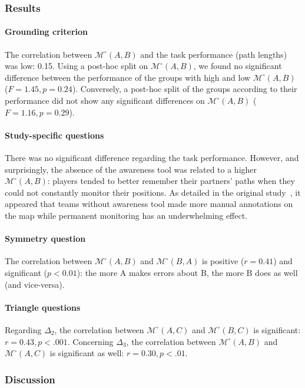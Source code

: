 \documentclass[natbib]{svjour3}
\newcommand{\A}{A\xspace}
\newcommand{\B}{B\xspace}
\newcommand{\gModel}[2]{{$\mathcal{M}^{\circ}(#1, #2)$}}
\begin{document}
\subsubsection*{Results}

\paragraph{Grounding criterion} The correlation between \gModel{A}{B} and the
task performance (path lengths) was low: 0.15. Using a post-hoc split on
\gModel{A}{B}, we found no significant difference between the performance of the
groups with high and low \gModel{A}{B}  ($F = 1.45, p = 0.24$). Conversely, a
post-hoc split of the groups according to their performance did not show
any significant differences on \gModel{A}{B} ($F = 1.16, p = 0.29$).

\paragraph{Study-specific questions} There was no significant difference
regarding the task performance. However, and surprisingly, the absence of the
awareness tool was related to a higher \gModel{A}{B}: players tended to better
remember their partners' paths when they could not constantly monitor their
positions. As detailed in the original study~\citep{nova2005location}, it
appeared that teams without awareness tool made more manual annotations on the
map while permanent monitoring has an underwhelming effect.

\paragraph{Symmetry question} The correlation between \gModel{A}{B}  and
\gModel{B}{A}  is positive ($r = 0.41$) and significant ($p < 0.01$): the more \A
makes errors about \B, the more \B does as well (and vice-versa).

\paragraph{Triangle questions} Regarding $\Delta_2$, the correlation between
\gModel{A}{C} and \gModel{B}{C} is significant: $r=0.43, p <.001$. Concerning
$\Delta_3$, the correlation between \gModel{A}{B} and \gModel{A}{C} is
significant as well: $r=0.30, p <.01$.

\subsubsection*{Discussion}
\end{document}
